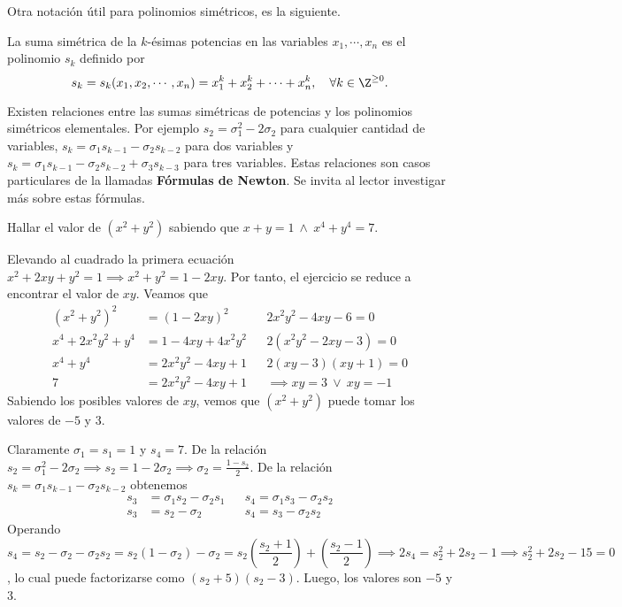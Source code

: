 Otra notación útil para polinomios simétricos, es la siguiente.

\begin{definition}
    La suma simétrica de la $k$-ésimas potencias en las variables $x_1, \cdots, x_n$ es el polinomio $s_k$ definido por
    \[s_k = s_k(x_1, x_2, \cdots, x_n) = x_1^k + x_2^k + \cdots + x_n^k, \quad \forall k \in \Z^{\geq 0}.\]
\end{definition}

Existen relaciones entre las sumas simétricas de potencias y los polinomios simétricos elementales.
Por ejemplo $s_2 = \sigma_1^2 - 2\sigma_2$ para cualquier cantidad de variables, $s_k = \sigma_1 s_{k - 1} - \sigma_2 s_{k - 2}$ para dos variables y $s_k = \sigma_1 s_{k - 1} - \sigma_2 s_{k - 2} + \sigma_3 s_{k - 3}$ para tres variables.
Estas relaciones son casos particulares de la llamadas \textbf{Fórmulas de Newton}.
Se invita al lector investigar más sobre estas fórmulas.

\begin{example}
    Hallar el valor de $(x^2 + y^2)$ sabiendo que $x + y = 1\ \land\ x^4 + y^4 = 7$.
\end{example}
\begin{solution}[1]
    Elevando al cuadrado la primera ecuación $x^2 + 2xy + y^2 = 1 \implies x^2 + y^2 = 1 - 2xy$.
    Por tanto, el ejercicio se reduce a encontrar el valor de $xy$.
    Veamos que
    \begin{align*}
    (x^2 + y^2)^2 &= (1 - 2xy)^2 && 2x^2 y^2 - 4xy - 6 = 0\\
    x^4 + 2x^2 y^2 + y^4 &= 1 - 4xy + 4x^2 y^2 && 2(x^2 y^2 - 2xy - 3) = 0\\
    x^4 + y^4 &= 2x^2 y^2 - 4xy + 1 && 2(xy - 3)(xy + 1) = 0\\
    7 &= 2x^2 y^2 - 4xy + 1 && \implies xy = 3\ \lor \ xy = -1
    \end{align*}
    Sabiendo los posibles valores de $xy$, vemos que $(x^2 + y^2)$ puede tomar los valores de $-5$ y 3.
\end{solution}

\begin{solution}[2]
    Claramente $\sigma_1 = s_1 = 1$ y $s_4 = 7$.
    De la relación $s_2 = \sigma_1^2 - 2\sigma_2 \implies s_2 = 1 - 2\sigma_2 \implies \sigma_2 = \frac{1 - s_2}{2}$.
    De la relación $s_k = \sigma_1 s_{k - 1} - \sigma_2 s_{k - 2}$ obtenemos
    \begin{align*}
        s_3 &= \sigma_1 s_2 - \sigma_2 s_1 && s_4 = \sigma_1 s_3 - \sigma_2 s_2\\
        s_3 &= s_2 - \sigma_2 && s_4 = s_3 - \sigma_2 s_2
    \end{align*}
    Operando $s_4 = s_2 - \sigma_2 - \sigma_2 s_2 = s_2 (1 - \sigma_2) - \sigma_2 = s_2\left(\dfrac{s_2 + 1}{2}\right) + \left(\dfrac{s_2 - 1}{2}\right) \implies 2s_4 = s_2^2 + 2s_2 - 1 \implies s_2^2 + 2s_2 - 15 = 0$, lo cual puede factorizarse como $(s_2 + 5)(s_2 - 3)$.
    Luego, los valores son $-5$ y 3.
\end{solution}



